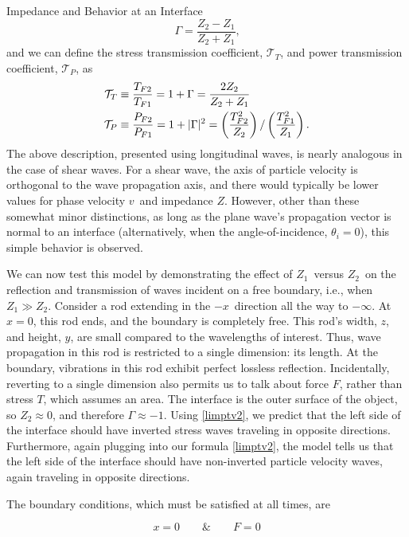 \documentclass[a4paper,10pt]{report}
\numberwithin{equation}{section}
\begin{document}
{\begin{chapter}
\begin{section}{Impedance and Behavior at an Interface}
\begin{equation}
 \Gamma = \frac{Z_2 - Z_1}{Z_2 + Z_1} \text{,}
\end{equation}
and we can define the stress transmission coefficient, $\mathcal{T}_T$, and power transmission coefficient, $\mathcal{T}_P$, as
\begin{align}
\mathcal{T}_T &\equiv \frac{T_{F2}}{T_{F1}} = 1 + \Gamma = \frac{2Z_2}{Z_2 + Z_1}\notag\\
\mathcal{T}_P &\equiv \frac{P_{F2}}{P_{F1}} = 1 + | \Gamma |^2  = \left(\frac{T_{F2}^2}{Z_2}\right)/\left(\frac{T_{F1}^2}{Z_1}\right) \text{.}
\end{align}
The above description, presented using longitudinal waves, is nearly analogous in the case of shear waves. For a shear wave, the axis of particle velocity is orthogonal to the wave propagation axis, and there would typically be lower values for phase velocity $v$\  and impedance $Z$. However, other than these somewhat minor distinctions, as long as the plane wave's propagation vector is normal to an interface (alternatively, when the angle-of-incidence, $\theta_i = 0$), this simple behavior is observed.\cite[pp.~9-14]{Kino1987}
\par
We can now test this model by demonstrating the effect of $Z_1$\  versus $Z_2$\  on the reflection and transmission of waves incident on a free boundary, i.e., when $Z_1 \gg Z_2$. Consider a rod extending in the $-x$\  direction all the way to $-\infty$. At $x = 0$, this rod ends, and the boundary is completely free. This rod's width, $z$, and height, $y$, are small compared to the wavelengths of interest. Thus, wave propagation in this rod is restricted to a single dimension: its length. At the boundary, vibrations in this rod exhibit perfect lossless reflection. Incidentally, reverting to a single dimension also permits us to talk about force $F$, rather than stress $T$, which assumes an area. The interface is the outer surface of the object, so $Z_2 \approx 0$, and therefore $\Gamma \approx -1$. Using \eqref{limptv2}, we predict that the left side of the interface should have inverted stress waves traveling in opposite directions. Furthermore, again plugging into our formula \eqref{limptv2}, the model tells us 
that the left side of the interface should have non-inverted particle velocity waves, again traveling in opposite directions. 
\par
The boundary conditions, which must be satisfied at all times, are
\par
\begin{equation}
 x = 0 \qquad \text{\&} \qquad F = 0
 

\end{equation}
\end{section}
\end{chapter}}
\end{document}
